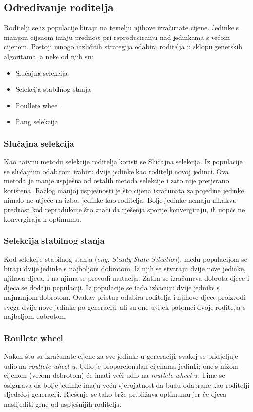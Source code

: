 \documentclass[times, utf8, zavrsni, numeric]{fer}
\begin{document}
\subsection{Određivanje roditelja}
Roditelji se iz populacije biraju na temelju njihove izračunate cijene. Jedinke s manjom cijenom imaju prednost pri reproduciranju nad jedinkama s većom cijenom. Postoji mnogo različitih strategija odabira roditelja u sklopu genetskih algoritama, a neke od njih su:
\begin{itemize}
    \item Slučajna selekcija
    \item Selekcija stabilnog stanja
    \item Roullete wheel
    \item Rang selekcija
\end{itemize}

\subsubsection{Slučajna selekcija}
Kao naivnu metodu selekcije roditelja koristi se Slučajna selekcija. Iz populacije se slučajnim odabirom izabiru dvije jedinke kao roditelji novoj jedinci. Ova metoda je manje uspješna od ostalih metoda selekcije i zato nije pretjerano korištena. Razlog manjoj uspješnosti je što cijena izračunata za pojedine jedinke nimalo ne utječe na izbor jedinke kao roditelja. Bolje jedinke nemaju nikakvu prednost kod reprodukcije što znači da rješenja sporije konvergiraju, ili uopće ne konvergiraju k optimumu.

\subsubsection{Selekcija stabilnog stanja}
Kod selekcije stabilnog stanja (\textit{eng. Steady State Selection}), među populacijom se biraju dvije jedinke s najboljom dobrotom. Iz njih se stvaraju dvije nove jedinke, njihova djeca, i na njima se provodi mutacija. Zatim se izračunava dobrota djece i djeca se dodaju populaciji. Iz populacije se tada izbacuju dvije jednike s najmanjom dobrotom. Ovakav pristup odabira roditelja i njihove djece proizvodi svega dvije nove jedinke po generaciji, ali su one uvijek potomci dvoje roditelja s najboljom dobrotom.  

\subsubsection{Roullete wheel}
Nakon što su izračunate cijene za sve jedinke u generaciji, svakoj se pridjeljuje udio na \textit{roullete wheel-u}. Udio je proporcionalan cijenama jedinki; one s nižom cijenom (većom dobrotom) će imati veći udio na \textit{roullete wheel-u}. Time se osigurava da bolje jedinke imaju veću vjerojatnost da budu odabrane kao roditelji sljedećoj generaciji. Rješenje se tako brže približava optimumu jer će djeca naslijediti gene od uspješnijih roditelja. 
\end{document}
